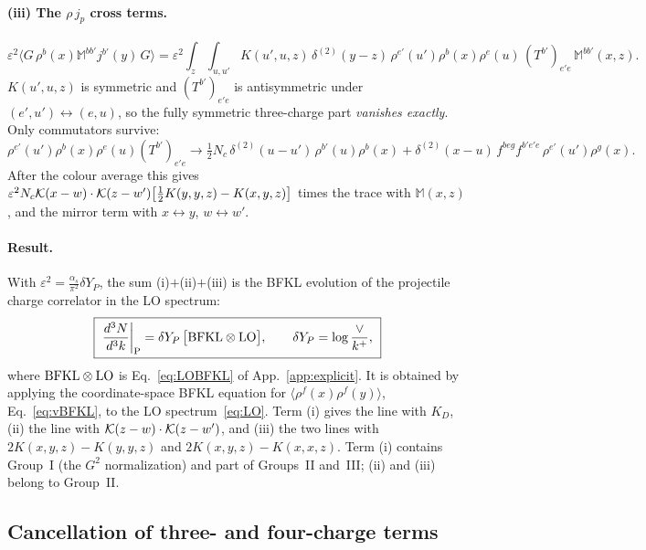 \paragraph*{(iii) The $\rho\,j_p$ cross terms.}
\begin{equation}
\varepsilon^2\langle G\,\rho^b(x)\mathbb M^{bb'}j^{b'}(y)\,G\rangle=\varepsilon^2\int_z\int_{u,u'}K(u',u,z)\,\delta^{(2)}(y-z)\,\rho^{e'}(u')\rho^b(x)\rho^e(u)\,(T^{b'})_{e'e}\,\mathbb M^{bb'}(x,z).
\end{equation}
$K(u',u,z)$ is symmetric and $(T^{b'})_{e'e}$ is antisymmetric under $(e',u')\leftrightarrow(e,u)$, so the fully symmetric three-charge part \emph{vanishes exactly}. Only commutators survive:
\begin{equation}
\rho^{e'}(u')\rho^b(x)\rho^e(u)(T^{b'})_{e'e}\to\tfrac12N_c\,\delta^{(2)}(u-u')\,\rho^{b'}(u)\rho^b(x)+\delta^{(2)}(x-u)\,f^{beg}f^{b'e'e}\,\rho^{e'}(u')\rho^g(x).
\end{equation}
After the colour average this gives $\varepsilon^2N_c\mathcal{K}(x-w)\cdot\mathcal{K}(z-w')\big[\frac12K(y,y,z)-K(x,y,z)\big]$ times the trace with $\mathbb M(x,z)$, and the mirror term with $x\leftrightarrow y$, $w\leftrightarrow w'$.

\paragraph*{Result.} With $\varepsilon^2=\frac{\alpha_s}{\pi^2}\delta Y_P$, the sum (i)$+$(ii)$+$(iii) is the BFKL evolution of the projectile charge correlator in the LO spectrum:
\begin{equation}
\boxed{\ \frac{d^3N}{d^3k}\bigg|_{\rm P}=\delta Y_P\,\big[{\rm BFKL}\otimes{\rm LO}\big],\qquad \delta Y_P=\log\frac{\vee}{k^+},\ }
\label{eq:Presult}
\end{equation}
where ${\rm BFKL}\otimes{\rm LO}$ is Eq.~\eqref{eq:LOBFKL} of App.~\ref{app:explicit}. It is obtained by applying the coordinate-space BFKL equation for $\langle\rho^f(x)\rho^f(y)\rangle$, Eq.~\eqref{eq:vBFKL}, to the LO spectrum~\eqref{eq:LO}. Term (i) gives the line with $K_D$, (ii) the line with $\mathcal{K}(z-w)\cdot\mathcal{K}(z-w')$, and (iii) the two lines with $2K(x,y,z)-K(y,y,z)$ and $2K(x,y,z)-K(x,x,z)$. Term (i) contains Group~I (the $G^2$ normalization) and part of Groups~II and~III; (ii) and (iii) belong to Group~II.

\subsection{Cancellation of three- and four-charge terms}\label{sec:cancel}


